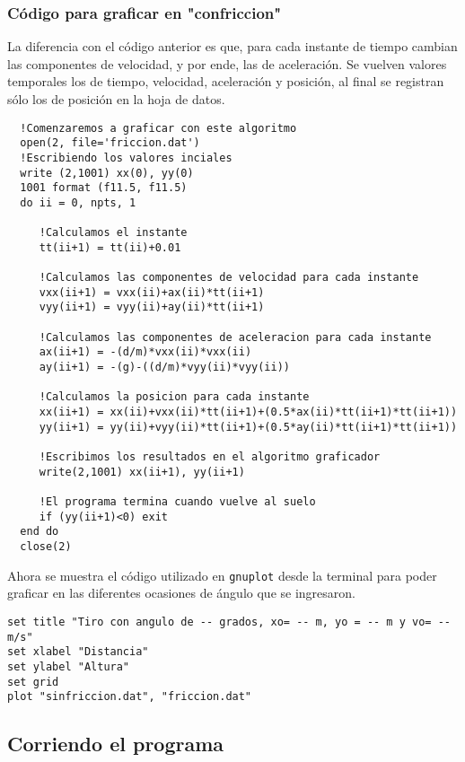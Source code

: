 \documentclass[a4paper]{article}
\begin{document}
\subsubsection{Código para graficar en "confriccion"}
La diferencia con el código anterior es que, para cada instante de tiempo cambian las componentes de velocidad, y por ende, las de aceleración. Se vuelven valores temporales los de tiempo, velocidad, aceleración y posición, al final se registran sólo los de posición en la hoja de datos.
\begin{verbatim}
  !Comenzaremos a graficar con este algoritmo   
  open(2, file='friccion.dat')   
  !Escribiendo los valores inciales
  write (2,1001) xx(0), yy(0)
  1001 format (f11.5, f11.5)
  do ii = 0, npts, 1
     
     !Calculamos el instante
     tt(ii+1) = tt(ii)+0.01 
    
     !Calculamos las componentes de velocidad para cada instante 
     vxx(ii+1) = vxx(ii)+ax(ii)*tt(ii+1)   
     vyy(ii+1) = vyy(ii)+ay(ii)*tt(ii+1)  

     !Calculamos las componentes de aceleracion para cada instante
     ax(ii+1) = -(d/m)*vxx(ii)*vxx(ii)
     ay(ii+1) = -(g)-((d/m)*vyy(ii)*vyy(ii))

     !Calculamos la posicion para cada instante
     xx(ii+1) = xx(ii)+vxx(ii)*tt(ii+1)+(0.5*ax(ii)*tt(ii+1)*tt(ii+1))
     yy(ii+1) = yy(ii)+vyy(ii)*tt(ii+1)+(0.5*ay(ii)*tt(ii+1)*tt(ii+1))
     
     !Escribimos los resultados en el algoritmo graficador   
     write(2,1001) xx(ii+1), yy(ii+1)  

     !El programa termina cuando vuelve al suelo   
     if (yy(ii+1)<0) exit   
  end do
  close(2)
\end{verbatim} 

Ahora se muestra el código utilizado en \texttt{gnuplot} desde la terminal para poder graficar en las diferentes ocasiones de ángulo que se ingresaron. \\
\begin{verbatim}set title "Tiro con angulo de -- grados, xo= -- m, yo = -- m y vo= -- m/s" 
set xlabel "Distancia"
set ylabel "Altura"
set grid
plot "sinfriccion.dat", "friccion.dat"
\end{verbatim}

\subsection{Corriendo el programa}
\label{dos}
\end{document}
